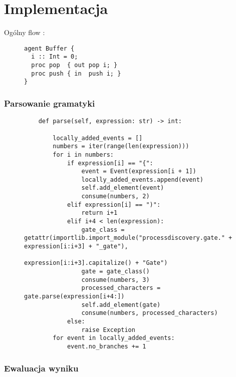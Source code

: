 \section{Implementacja}

Ogólny flow \cite{https://doi.org/10.1002/widm.1045}:
\begin{figure}[!ht]
\lstset{caption=Parser gramatyki, captionpos=b}
\lstset{label=src:passive, frame=single}
\begin{lstlisting}
agent Buffer {
  i :: Int = 0;
  proc pop  { out pop i; }
  proc push { in  push i; }
}
\end{lstlisting}
\end{figure}

\subsubsection{Parsowanie gramatyki}

\begin{figure}[!ht]
\lstset{caption=Parser gramatyki, captionpos=b}
\lstset{label=src:passive, frame=single}
\begin{lstlisting}
    def parse(self, expression: str) -> int:

        locally_added_events = []
        numbers = iter(range(len(expression)))
        for i in numbers:
            if expression[i] == "{":
                event = Event(expression[i + 1])
                locally_added_events.append(event)
                self.add_element(event)
                consume(numbers, 2)
            elif expression[i] == ")":
                return i+1
            elif i+4 < len(expression):
                gate_class = getattr(importlib.import_module("processdiscovery.gate." + expression[i:i+3] + "_gate"),
                                     expression[i:i+3].capitalize() + "Gate")
                gate = gate_class()
                consume(numbers, 3)
                processed_characters = gate.parse(expression[i+4:])
                self.add_element(gate)
                consume(numbers, processed_characters)
            else:
                raise Exception
        for event in locally_added_events:
            event.no_branches += 1
\end{lstlisting}
\end{figure}

\subsubsection{Ewaluacja wyniku}

